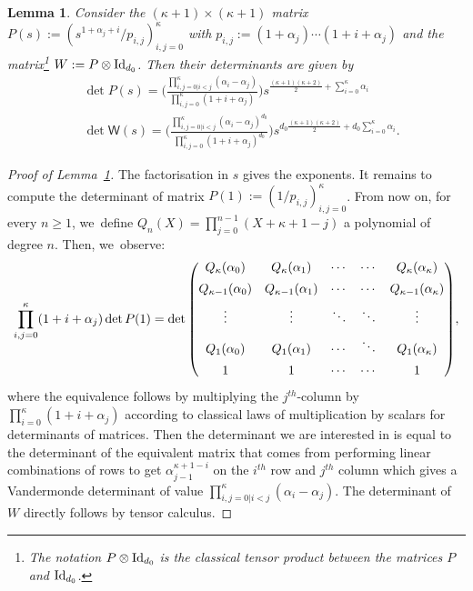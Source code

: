 \documentclass[JEP,XML,SOM,Unicode,NoFloatCountersInSection,published]{cedram}
\newtheorem{lemma}[theorem]{Lemma}
\theoremstyle{definition}
\newcommand{\sW}{{\mathsf W}}
\newcommand{\I}{\textup{Id}}\let\Id\I
\begin{document}
\begin{lemma}
\label{lem:wronskian}
Consider the $(\kappa+1)\times(\kappa+1)$ matrix
$P(s):= (s^{1+\alpha_j+i}/p_{i,j})_{i,j=0} ^\kappa$ with
$p_{i,j}:=(1+\alpha_j) \cdots (1+i+\alpha_j)$ and the matrix\footnote{The notation $P\otimes \I_{d_0}$ is the classical tensor product between the matrices $P$
and $\I_{d_0}$.} $W:=P\otimes \I_{d_0}$. Then their
determinants are given by
\begin{equation}
\label{eq:det-k}
\begin{aligned}
&\det P(s)=
\biggl(\frac{ \prod_{i, j=0 | i<j}^\kappa
(\alpha_i - \alpha_j)}{\prod_{i,j=0} ^\kappa(1+i+\alpha_j)}
\biggr) s^{ \frac{(\kappa+1)(\kappa+2)}{2}+\sum_{i=0}^\kappa \alpha_i}\\
&\det \sW(s) = \biggl(\frac{ \prod_{i, j=0 | i<j}^\kappa
(\alpha_i - \alpha_j)^{d_0}}{\prod_{i,j=0} ^\kappa(1+i+\alpha_j)^{d_0}}
\biggr) s^{d_0 \frac{(\kappa+1)(\kappa+2)}{2}+d_0\sum_{i=0}^\kappa \alpha_i}.
\end{aligned}
\end{equation}
\end{lemma}
\begin{proof}[Proof of Lemma~\ref{lem:wronskian}]
The factorisation in $s$ gives the exponents. It remains to compute the determinant of matrix ${P}(1):= (1/p_{i,j})_{i,j=0} ^\kappa$. From now on,
for every $n\geq1$, we~define $Q_n(X)=\prod_{j=0}^{n-1} (X+\kappa+1-j)$ a polynomial of degree $n$. Then, we~observe:
\[\arraycolsep5pt
\prod_{i,j=0} ^\kappa (1+i+\alpha_j) \det {P}(1)=
\det
\begin{pmatrix}
Q_{\kappa}(\alpha_0) & Q_{\kappa}(\alpha_1) &\cdots& \cdots & Q_{\kappa}(\alpha_{\kappa}) \\[5pt]
Q_{\kappa-1}(\alpha_0) & Q_{\kappa-1}(\alpha_1) &\cdots& \cdots & Q_{\kappa-1}(\alpha_{\kappa}) \\[5pt]
\vdots & \vdots& \ddots & \ddots & \vdots \\[5pt]
Q_{1}(\alpha_0) & Q_{1}(\alpha_1) &\cdots& \ddots & Q_{1}(\alpha_{\kappa}) \\[5pt]
1 & 1 &\cdots& \cdots & 1
\end{pmatrix}\!,
\]
where the equivalence follows by multiplying the $j^{th}$-column by $\prod_{i=0}^\kappa (1+i+\alpha_j)$ according to classical laws of multiplication by scalars for determinants of matrices. Then the determinant we are interested in is equal to the determinant of the equivalent matrix that comes from performing linear combinations of rows to get $\alpha_{j-1}^{\kappa+1-i}$ on the $i^{th}$ row and $j^{th}$ column which gives a Vandermonde determinant of value $\prod_{i, j=0 | i<j}^\kappa (\alpha_i - \alpha_j)$. The determinant of $W$ directly follows by tensor calculus.
\end{proof}
\end{document}
